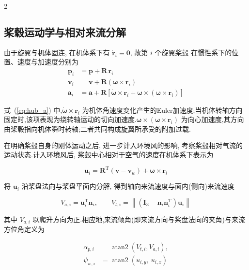 \documentclass{aas}
\begin{document}
\begin{multicols}{2}
\subsection{桨毂运动学与相对来流分解}
\label{subsec:hub_kinematics}

由于旋翼与机体固连, 在机体系下有 $\dot{\bm{r}}_i\equiv\bm{0}$, 故第 $i$ 个旋翼桨毂
在惯性系下的位置、速度与加速度分别为
\begin{align}
\bm{p}_i&=\bm{p}+\bm{R}\,\bm{r}_i \label{eq:hub_p}\\[2pt]
\bm{v}_i&=\bm{v}+\bm{R}\left(\bm{\omega}\times\bm{r}_i\right) \label{eq:hub_v}\\[2pt]
\bm{a}_i&=\bm{a}+\bm{R}\left[\dot{\bm{\omega}}\times\bm{r}_i
+\bm{\omega}\times\left(\bm{\omega}\times\bm{r}_i\right)\right] \label{eq:hub_a}
\end{align}

式~(\ref{eq:hub_a}) 中,\(\dot{\bm\omega}\times\bm r_i\) 为机体角速度变化产生的Euler加速度;当机体转轴方向固定时,该项表现为绕转轴运动的切向加速度.\(\bm\omega\times(\bm\omega\times\bm r_i)\) 为向心加速度,其方向由桨毂指向机体瞬时转轴;二者共同构成旋翼所承受的附加过载.

在明确桨毂自身的刚体运动之后, 进一步计入环境风的影响, 考察桨毂相对气流的运动状态.计入环境风后, 桨毂中心相对于空气的速度在机体系下表示为

\begin{equation}
\bm{u}_i=\bm{R}^{\mathrm{T}}\left(\bm{v}-\bm{v}_w\right)+\bm{\omega}\times\bm{r}_i
\label{eq:u_hub}
\end{equation}

将 $\bm{u}_i$ 沿桨盘法向与桨盘平面内分解, 得到轴向来流速度与面内(侧向)来流速度

\begin{equation}
V_{a,i}=\bm{u}_i^{\mathrm{T}}\bm{n}_i,\qquad
V_{t,i}=\left\|\left(\bm{I}_3-\bm{n}_i\bm{n}_i^{\mathrm{T}}\right)\bm{u}_i\right\|
\label{eq:decompose}
\end{equation}

其中 $V_{a,i}$ 以爬升方向为正.相应地,来流倾角(即来流方向与桨盘法向的夹角)与来流方位角定义为

\begin{equation}
\begin{aligned}
\alpha_{p,i}&=\operatorname{atan2}\!\left(V_{t,i},V_{a,i}\right), \\
\psi_{w,i}&=\operatorname{atan2}\!\left(u_{i,y},\ u_{i,x}\right)
\end{aligned}
\label{eq:alpha_psiw}
\end{equation}


\end{multicols}
\end{document}

